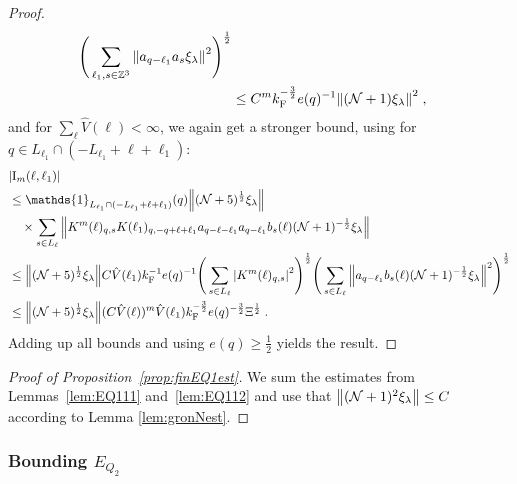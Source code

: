 \documentclass[12pt,a4paper]{article}
\numberwithin{equation}{section}
\newcommand{\1}{\mathbb{I}}
\newcommand{\F}{\mathrm{F}}
\newcommand{\I}{\mathrm{I}}
\newcommand{\Z}{\mathbb{Z}}
\newcommand{\NN}{\mathcal{N}}
\newcommand{\half}{\frac{1}{2}}
\theoremstyle{plain}
\theoremstyle{definition}
\theoremstyle{remark}
\theoremstyle{plain}
\theoremstyle{definition}
\theoremstyle{remark}
\begin{document}
\begin{proof}
\begin{align}
		\Bigg(\sum\limits_{\ell_1,s \in \Z^3} \norm{ a_{q-\ell_1} a_s \xi_\lambda }^2\Bigg)^\half \nonumber\\
	&\leq C^m k_{\F}^{-\frac 32} e(q)^{-1} \norm{(\NN+1) \xi_\lambda }^2 \;, \label{eq:estEQ1123_Coulomb}
\end{align}
and for $ \sum_{\ell} \hat{V}(\ell) < \infty $, we again get a stronger bound, using for $ q \in L_{\ell_1} \cap (-L_{\ell_1} + \ell + \ell_1) $:
\begin{align}
	&|\I_m(\ell, \ell_1)| \nonumber\\
	&\leq \mathds{1}_{L_{\ell_1} \cap (-L_{\ell_1} + \ell + \ell_1)}(q) \norm{(\NN+5)^{\half} \xi_\lambda} \nonumber\\
	& \quad \times
		\sum_{s \in L_{\ell}}
		\norm{ K^m(\ell)_{q,s} K(\ell_1)_{q,-q+\ell+\ell_1} a_{q-\ell-\ell_1} a_{q-\ell_1} b_{s}(\ell) (\NN+1)^{-\half} \xi_\lambda } \nonumber\\
	&\leq \norm{(\NN+5)^{\half} \xi_\lambda}
		C \hat{V}(\ell_1) k_{\F}^{-1} e(q)^{-1}
		\Bigg( \sum_{s \in L_{\ell}} \abs{K^m(\ell)_{q,s}}^2\Bigg)^\half
		\Bigg(\sum_{s \in L_{\ell}}  \norm{ a_{q-\ell_1} b_s(\ell) (\NN+1)^{-\half} \xi_\lambda }^2\Bigg)^\half \nonumber\\
	&\leq \norm{(\NN+5)^\half \xi_\lambda }
		(C \hat{V}(\ell))^m
		\hat{V}(\ell_1)
		k_{\F}^{-\frac 32} e(q)^{-\frac 32} \Xi^\half \;. \label{eq:estEQ1123}
\end{align}
Adding up all bounds and using $ e(q) \ge \half $ yields the result.
\end{proof}


\begin{proof}[Proof of Proposition~\ref{prop:finEQ1est}]
We sum the estimates from Lemmas~\ref{lem:EQ111} and~\ref{lem:EQ112} and use that $ \norm{(\NN+1)^2 \xi_\lambda} \le C $ according to Lemma \ref{lem:gronNest}.
\end{proof}






\subsubsection{Bounding $E_{Q_2}$}
\end{document}
